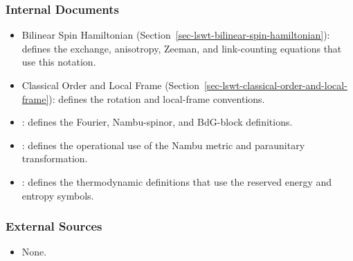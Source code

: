 \subsubsection{Internal Documents}

\begin{itemize}
\tightlist
\item
  Bilinear Spin Hamiltonian (Section~\ref{sec-lswt-bilinear-spin-hamiltonian}): defines the exchange, anisotropy, Zeeman, and link-counting equations that use this notation.
\item
  Classical Order and Local Frame (Section~\ref{sec-lswt-classical-order-and-local-frame}): defines the rotation and local-frame conventions.
\item
  : defines the Fourier, Nambu-spinor, and BdG-block definitions.
\item
  : defines the operational use of the Nambu metric and paraunitary transformation.
\item
  : defines the thermodynamic definitions that use the reserved energy and entropy symbols.
\end{itemize}

\subsubsection{External Sources}

\begin{itemize}
\tightlist
\item
  None.
\end{itemize}
